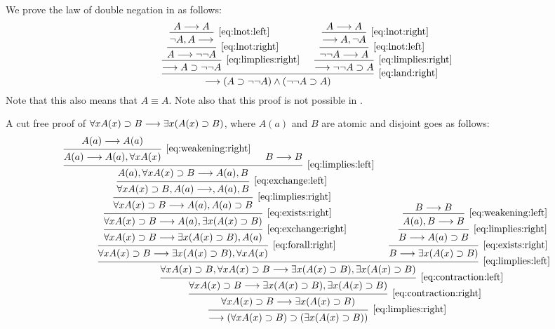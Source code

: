 \documentclass[11pt,a4paper]{article}
\begin{document}
\begin{example}\label{exa:double negation in LK}
    We prove the law of double negation in \LK{} as follows:
\begin{equation*}
    \begin{prooftree}
        \hypo{A\seq A}
        \infer1[\eqref{eq:lnot:left}]{\lnot A, A\seq}
        \infer1[\eqref{eq:lnot:right}]{A\seq\lnot\lnot A}
        \infer1[\eqref{eq:limplies:right}]{\seq A\limplies\lnot\lnot A}
        \hypo{A\seq A}
        \infer1[\eqref{eq:lnot:right}]{\seq A, \lnot A}
        \infer1[\eqref{eq:lnot:left}]{\lnot\lnot A\seq A}
        \infer1[\eqref{eq:limplies:right}]{\seq\lnot\lnot A\limplies A}
        \infer2[\eqref{eq:land:right}]{\seq\arcs{A\limplies\lnot\lnot A}\land\arcs{\lnot\lnot A\limplies A}}
    \end{prooftree}
\end{equation*}
    Note that this also means that \(A\equiv A\).
    Note also that this proof is not possible in \LJ.
\end{example}

\begin{exercise}\label{exa:cut free proof}
    A cut free proof of \(\forall x A(x)\supset B \longrightarrow \exists x (A(x)\supset B)\),
    where \(A(a)\) and \(B\) are atomic and disjoint goes as follows:
    \begin{equation*}
        \begin{prooftree}
            \hypo{A(a)\seq A(a)}
            \infer1[\eqref{eq:weakening:right}]{A(a)\seq A(a), \forall x A(x)}
            \hypo{B\seq B}
            \infer2[\eqref{eq:limplies:left}]{A(a), \forall xA(x)\limplies B\seq A(a), B}
            \infer1[\eqref{eq:exchange:left}]{\forall xA(x)\limplies B, A(a)\seq, A(a), B}
            \infer1[\eqref{eq:limplies:right}]{\forall xA(x)\limplies B\seq A(a), A(a)\limplies B}
            \infer1[\eqref{eq:exists:right}]{\forall xA(x)\limplies B\seq A(a), \exists x\arcs{A(x)\limplies B}}
            \infer1[\eqref{eq:exchange:right}]{\forall xA(x)\limplies B\seq\exists x\arcs{A(x)\limplies B}, A(a)}
            \infer1[\eqref{eq:forall:right}]{\forall xA(x)\limplies B\seq\exists x\arcs{A(x)\limplies B}, \forall x A(x)}
            \hypo{B\seq B}
            \infer1[\eqref{eq:weakening:left}]{A(a), B\seq B}
            \infer1[\eqref{eq:limplies:right}]{B\seq A(a)\limplies B}
            \infer1[\eqref{eq:exists:right}]{B\seq\exists x\arcs{A(x)\limplies B}}
            \infer2[\eqref{eq:limplies:left}]{\forall x A(x)\limplies B, \forall x A(x)\limplies B \seq \exists x \arcs{A(x)\limplies B}, \exists x \arcs{A(x)\limplies B}}
            \infer1[\eqref{eq:contraction:left}]{\forall x A(x)\limplies B \seq \exists x \arcs{A(x)\limplies B}, \exists x \arcs{A(x)\limplies B}}
            \infer1[\eqref{eq:contraction:right}]{\forall x A(x)\limplies B \seq \exists x \arcs{A(x)\limplies B}}
            \infer1[\eqref{eq:limplies:right}]{\seq\arcs{\forall x A(x)\limplies B}\limplies\arcs{\exists x \arcs{A(x)\limplies B}}}
        \end{prooftree}
    \end{equation*}
\end{exercise}
\end{document}
